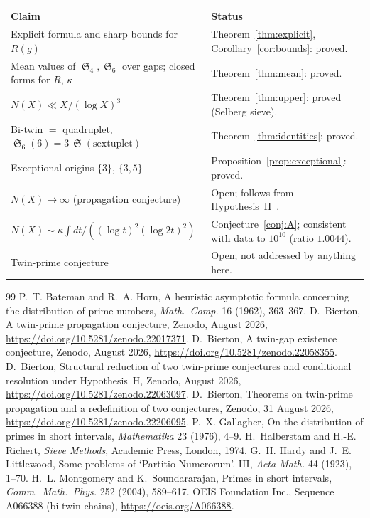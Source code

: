 \documentclass[11pt,a4paper]{article}
\theoremstyle{plain}
\theoremstyle{definition}
\theoremstyle{remark}
\newcommand{\Rbar}{\overline{R}}
\DeclareMathOperator{\Sing}{\mathfrak S}
\begin{document}
\begin{center}
\begin{tabular}{@{}p{}p{}@{}}\toprule
\textbf{Claim} & \textbf{Status}\\ \midrule
Explicit formula and sharp bounds for $R(g)$ & Theorem~\ref{thm:explicit}, Corollary~\ref{cor:bounds}: proved.\\
Mean values of $\Sing_4,\Sing_6$ over gaps; closed forms for $\Rbar$, $\kappa$ & Theorem~\ref{thm:mean}: proved.\\
$N(X)\ll X/(\log X)^3$ & Theorem~\ref{thm:upper}: proved (Selberg sieve).\\
Bi-twin $=$ quadruplet, $\Sing_6(6)=3\,\Sing(\text{sextuplet})$ & Theorem~\ref{thm:identities}: proved.\\
Exceptional origins $\{3\}$, $\{3,5\}$ & Proposition~\ref{prop:exceptional}: proved.\\
$N(X)\to\infty$ (propagation conjecture) & Open; follows from Hypothesis~H~\cite{BiertonThm}.\\
$N(X)\sim\kappa\int dt/((\log t)^2(\log2t)^2)$ & Conjecture~\ref{conj:A}; consistent with data to $10^{10}$ (ratio $1.0044$).\\
Twin-prime conjecture & Open; not addressed by anything here.\\ \bottomrule
\end{tabular}
\end{center}

\begin{thebibliography}{99}
 P.~T. Bateman and R.~A. Horn, A heuristic asymptotic formula
concerning the distribution of prime numbers, \textit{Math.\ Comp.} 16
(1962), 363--367.
 D.~Bierton, A twin-prime propagation conjecture,
Zenodo, August 2026, \url{https://doi.org/10.5281/zenodo.22017371}.
 D.~Bierton, A twin-gap existence conjecture, Zenodo,
August 2026, \url{https://doi.org/10.5281/zenodo.22058355}.
 D.~Bierton, Structural reduction of two twin-prime
conjectures and conditional resolution under Hypothesis~H, Zenodo, August
2026, \url{https://doi.org/10.5281/zenodo.22063097}.
 D.~Bierton, Theorems on twin-prime propagation and a
redefinition of two conjectures, Zenodo, 31 August 2026,
\url{https://doi.org/10.5281/zenodo.22206095}.
 P.~X. Gallagher, On the distribution of primes in
short intervals, \textit{Mathematika} 23 (1976), 4--9.
 H.~Halberstam and H.-E. Richert, \textit{Sieve Methods},
Academic Press, London, 1974.
 G.~H. Hardy and J.~E. Littlewood, Some problems of `Partitio
Numerorum'. III, \textit{Acta Math.} 44 (1923), 1--70.
 H.~L. Montgomery and K.~Soundararajan, Primes in short
intervals, \textit{Comm.\ Math.\ Phys.} 252 (2004), 589--617.
 OEIS Foundation Inc., Sequence A066388 (bi-twin chains),
\url{https://oeis.org/A066388}.
\end{thebibliography}
\end{document}
